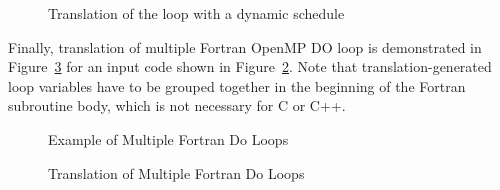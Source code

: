 \begin{figure}[htbp]
{\indent
  {\mySmallFontSize
    \begin{latexonly}
    
    \end{latexonly}
    \begin{htmlonly}
    
    \end{htmlonly}
  }
}
\caption{Translation of the loop with a dynamic schedule}
\label{Manual:omp:ompfor4-trans}
\end{figure}

\clearpage
Finally, translation of multiple Fortran OpenMP DO loop 
is demonstrated in
Figure~\ref{Manual:omp:do-multiple-trans-f} for an input code shown in
Figure~\ref{Manual:omp:do-multiple-f}. Note that translation-generated loop variables
have to be grouped together in the beginning of the Fortran subroutine body, which is not necessary for 
C or C++.

\lstset{language=Fortran,basicstyle=\scriptsize}
\lstset{language=Fortran,basicstyle=\scriptsize,numbers=left}
\begin{figure}[htbp]
{\indent
  {\mySmallFontSize
    \begin{latexonly}
    
    \end{latexonly}
    \begin{htmlonly}
    
    \end{htmlonly}
  }
}
\caption{Example of Multiple Fortran Do Loops}
\label{Manual:omp:do-multiple-f}
\end{figure}

\begin{figure}[htbp]
{\indent
  {\mySmallFontSize
    \begin{latexonly}
    
    \end{latexonly}
    \begin{htmlonly}
    
    \end{htmlonly}
  }
}
\caption{Translation of Multiple Fortran Do Loops}
\label{Manual:omp:do-multiple-trans-f}
\end{figure}


